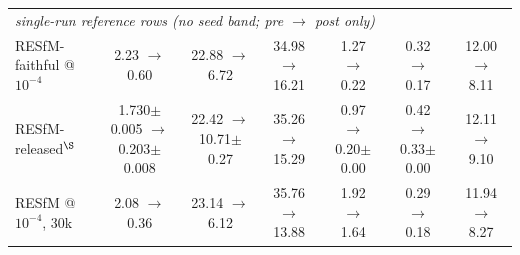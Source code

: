 \documentclass[10pt,twocolumn,letterpaper]{article}
\begin{document}
\begin{table}[t]
{\begin{tabular}{lcccccc}
\midrule
\multicolumn{7}{l}{\emph{single-run reference rows (no seed band; pre $\to$ post only)}}\\[1pt]
RESfM-faithful @$10^{-4}$ & 2.23 $\to$ 0.60 & 22.88 $\to$ 6.72 & 34.98 $\to$ 16.21 & 1.27 $\to$ 0.22 & 0.32 $\to$ 0.17 & 12.00 $\to$ 8.11\\
RESfM-released$^{\S}$ & 1.730$\pm$0.005 $\to$ 0.203$\pm$0.008 & 22.42 $\to$ 10.71$\pm$0.27 & 35.26 $\to$ 15.29 & 0.97 $\to$ 0.20$\pm$0.00 & 0.42 $\to$ 0.33$\pm$0.00 & 12.11 $\to$ 9.10\\
RESfM @$10^{-4}$, 30k & 2.08 $\to$ 0.36 & 23.14 $\to$ 6.12 & 35.76 $\to$ 13.88 & 1.92 $\to$ 1.64 & 0.29 $\to$ 0.18 & 11.94 $\to$ 8.27\\
\bottomrule
\end{tabular}}%
\end{table}
\end{document}
